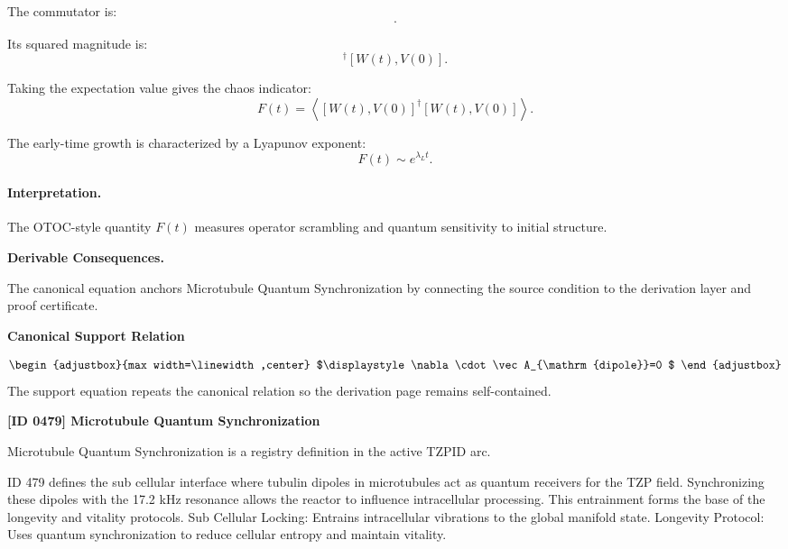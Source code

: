 The commutator is:
\begin{equation}
[W(t),V(0)] .
\end{equation}

Its squared magnitude is:
\begin{equation}
[W(t),V(0)]^\dagger[W(t),V(0)] .
\end{equation}

Taking the expectation value gives the chaos indicator:
\begin{equation}
\boxed{
F(t)
=
\left\langle
[W(t),V(0)]^\dagger
[W(t),V(0)]
\right\rangle .
}
\end{equation}

The early-time growth is characterized by a Lyapunov exponent:
\begin{equation}
F(t)\sim e^{\lambda_L t}.
\end{equation}

\paragraph{Interpretation.}
The OTOC-style quantity $F(t)$ measures operator scrambling and quantum sensitivity to initial structure.

\par\vspace{0.35em}
\noindent\textbf{Derivable Consequences.}\quad
\begingroup
\footnotesize
\raggedright
The canonical equation anchors Microtubule Quantum Synchronization by connecting the source condition to the derivation layer and proof certificate.
\par\endgroup

\noindent\textbf{Canonical Support Relation}\par
\[
\begin{adjustbox}{max width=\linewidth,center}
$\displaystyle
\nabla\cdot\vec A_{\mathrm{dipole}}=0
$
\end{adjustbox}
\]
\noindent The support equation repeats the canonical relation so the derivation page remains self-contained.\par

\clearpage
\noindent\textbf{[ID 0479] Microtubule Quantum Synchronization}\par
\vspace{0.35em}
\begingroup\small
{}
Microtubule Quantum Synchronization is a registry definition in the active TZPID arc.

ID 479 defines the sub cellular interface where tubulin dipoles in microtubules act as quantum receivers for the TZP field. Synchronizing these dipoles with the 17.2 kHz resonance allows the reactor to influence intracellular processing. This entrainment forms the base of the longevity and vitality protocols. Sub Cellular Locking: Entrains intracellular vibrations to the global manifold state. Longevity Protocol: Uses quantum synchronization to reduce cellular entropy and maintain vitality.

